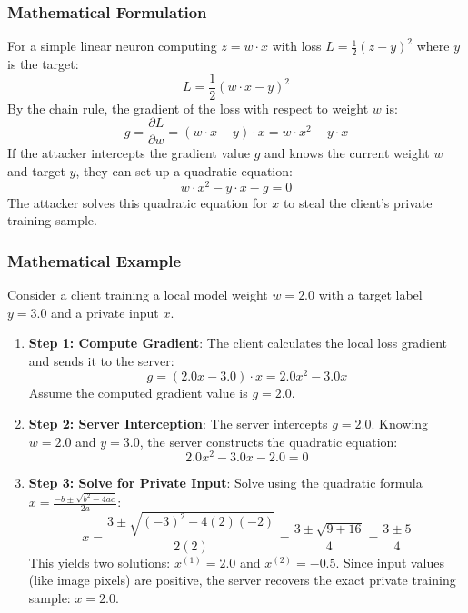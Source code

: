 \documentclass{article}
\begin{document}
\subsubsection{Mathematical Formulation}
For a simple linear neuron computing $z = w \cdot x$ with loss $L = \frac{1}{2}(z - y)^2$ where $y$ is the target:
\begin{equation}
    L = \frac{1}{2}(w \cdot x - y)^2
\end{equation}
By the chain rule, the gradient of the loss with respect to weight $w$ is:
\begin{equation}
    g = \frac{\partial L}{\partial w} = (w \cdot x - y) \cdot x = w \cdot x^2 - y \cdot x
\end{equation}
If the attacker intercepts the gradient value $g$ and knows the current weight $w$ and target $y$, they can set up a quadratic equation:
\begin{equation}
    w \cdot x^2 - y \cdot x - g = 0
\end{equation}
The attacker solves this quadratic equation for $x$ to steal the client's private training sample.

\subsubsection{Mathematical Example}
Consider a client training a local model weight $w = 2.0$ with a target label $y = 3.0$ and a private input $x$.
\begin{enumerate}
    \item \textbf{Step 1: Compute Gradient}: The client calculates the local loss gradient and sends it to the server:
    $$g = (2.0 x - 3.0) \cdot x = 2.0 x^2 - 3.0 x$$
    Assume the computed gradient value is $g = 2.0$.
    
    \item \textbf{Step 2: Server Interception}: The server intercepts $g = 2.0$. Knowing $w = 2.0$ and $y = 3.0$, the server constructs the quadratic equation:
    $$2.0 x^2 - 3.0 x - 2.0 = 0$$
    
    \item \textbf{Step 3: Solve for Private Input}: Solve using the quadratic formula $x = \frac{-b \pm \sqrt{b^2 - 4ac}}{2a}$:
    $$x = \frac{3 \pm \sqrt{(-3)^2 - 4(2)(-2)}}{2(2)} = \frac{3 \pm \sqrt{9 + 16}}{4} = \frac{3 \pm 5}{4}$$
    This yields two solutions: $x^{(1)} = 2.0$ and $x^{(2)} = -0.5$. Since input values (like image pixels) are positive, the server recovers the exact private training sample: $x = 2.0$.
\end{enumerate}
\end{document}
